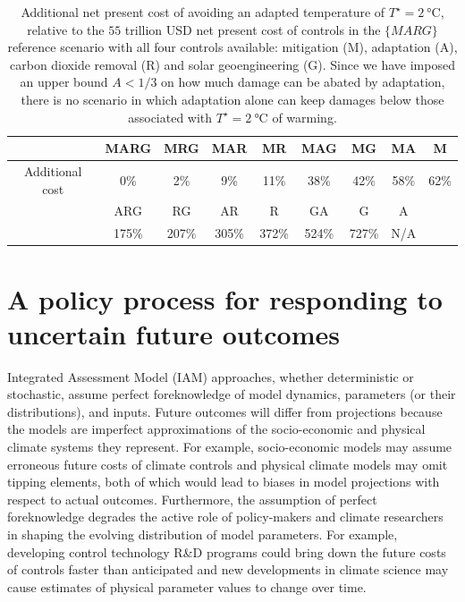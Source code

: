 \documentclass{article}
\begin{document}
\begin{table}[t]
\begin{center}
 \begin{tabular}{|| c || c | c | c | c | c | c | c | c ||}
 \hline
 & MARG & MRG & MAR & MR & MAG & MG & MA & M \\ [0.5ex] 
 \hline
 Additional cost &
 0\% &
 2\% &
 9\% &
 11\% &
 38\% &
 42\% &
 58\% &
 62\%
 \\
 \hline\hline\hline
 & ARG & RG & AR & R & GA & G & A & \\
 \hline
 &
 175\% &
 207\% &
 305\% &
 372\% &
 524\% &
 727\% &
 N/A &
 \\
 \hline
 \end{tabular}
\end{center}
\caption{Additional net present cost of avoiding an adapted temperature of $T^{\star}=\SI{2}{\celsius}$, relative to the $55$ trillion USD net present cost of controls in the $\{MARG\}$ reference scenario with all four controls available: mitigation (M), adaptation (A), carbon dioxide removal (R) and solar geoengineering (G). Since we have imposed an upper bound $A<1/3$ on how much damage can be abated by adaptation, there is no scenario in which adaptation alone can keep damages below those associated with $T^{\star} = \SI{2}{\celsius}$ of warming.}
\label{tab.relative_control_costs}
\end{table}

\section{A policy process for responding to uncertain future outcomes}\label{sec.reactive}

Integrated Assessment Model (IAM) approaches, whether deterministic or stochastic, assume perfect foreknowledge of model dynamics, parameters (or their distributions), and inputs. Future outcomes will differ from projections because the models are imperfect approximations of the socio-economic and physical climate systems they represent. For example, socio-economic models may assume erroneous future costs of climate controls and physical climate models may omit tipping elements, both of which would lead to biases in model projections with respect to actual outcomes. Furthermore, the assumption of perfect foreknowledge degrades the active role of policy-makers and climate researchers in shaping the evolving distribution of model parameters. For example, developing control technology R\&D programs could bring down the future costs of controls faster than anticipated and new developments in climate science may cause estimates of physical parameter values to change over time.
\end{document}
